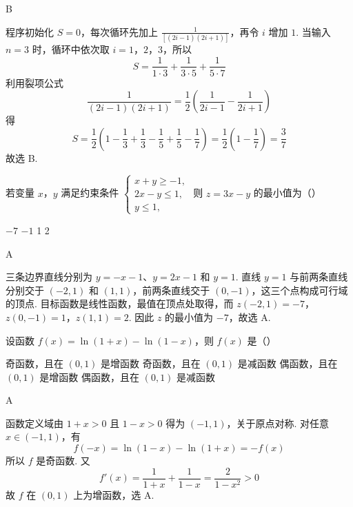\begin{answer}
B
\end{answer}

\begin{solution}
程序初始化 \(S=0\)，每次循环先加上 \(\frac{1}{[(2i-1)(2i+1)]}\)，再令 \(i\) 增加 \(1\). 当输入 \(n=3\) 时，循环中依次取 \(i=1\)，\(2\)，\(3\)，所以
\[
S=\frac{1}{1\cdot3}+\frac{1}{3\cdot5}+\frac{1}{5\cdot7}
\]
利用裂项公式
\[
\frac{1}{(2i-1)(2i+1)}=\frac12\left(\frac{1}{2i-1}-\frac{1}{2i+1}\right)
\]
得
\[
S=\frac12\left(1-\frac13+\frac13-\frac15+\frac15-\frac17\right)=\frac12\left(1-\frac17\right)=\frac37
\]
故选 B.
\end{solution}

\begin{problem}
若变量 \(x\)，\(y\) 满足约束条件 \(\begin{cases}
x + y \geqslant -1,\\
2x - y \leqslant 1,\\
y \leqslant 1,
\end{cases}\) 则 \(z = 3x - y\) 的最小值为（\quad）

\choices
    {\(-7\)}
    {\(-1\)}
    {1}
    {2}
\end{problem}

\begin{answer}
A
\end{answer}

\begin{solution}
三条边界直线分别为 \(y=-x-1\)、\(y=2x-1\) 和 \(y=1\). 直线 \(y=1\) 与前两条直线分别交于 \((-2,1)\) 和 \((1,1)\)，前两条直线交于 \((0,-1)\)，这三个点构成可行域的顶点. 目标函数是线性函数，最值在顶点处取得，而
\(z(-2,1)=-7\)，\(z(0,-1)=1\)，\(z(1,1)=2\).
因此 \(z\) 的最小值为 \(-7\)，故选 A.
\end{solution}

\begin{problem}
设函数 \( f(x) = \ln (1 + x) - \ln (1 - x) \)，则 \( f(x) \) 是（\quad）

\choices
    {奇函数，且在 \( (0,1) \) 是增函数}
    {奇函数，且在 \((0,1)\) 是减函数}
    {偶函数，且在 \((0,1)\) 是增函数}
    {偶函数，且在 \((0,1)\) 是减函数}
\end{problem}

\begin{answer}
A
\end{answer}

\begin{solution}
函数定义域由 \(1+x>0\) 且 \(1-x>0\) 得为 \((-1,1)\)，关于原点对称. 对任意 \(x\in(-1,1)\)，有
\[
f(-x)=\ln(1-x)-\ln(1+x)=-f(x)
\]
所以 \(f\) 是奇函数. 又
\[
f'(x)=\frac{1}{1+x}+\frac{1}{1-x}=\frac{2}{1-x^2}>0
\]
故 \(f\) 在 \((0,1)\) 上为增函数，选 A.
\end{solution}

